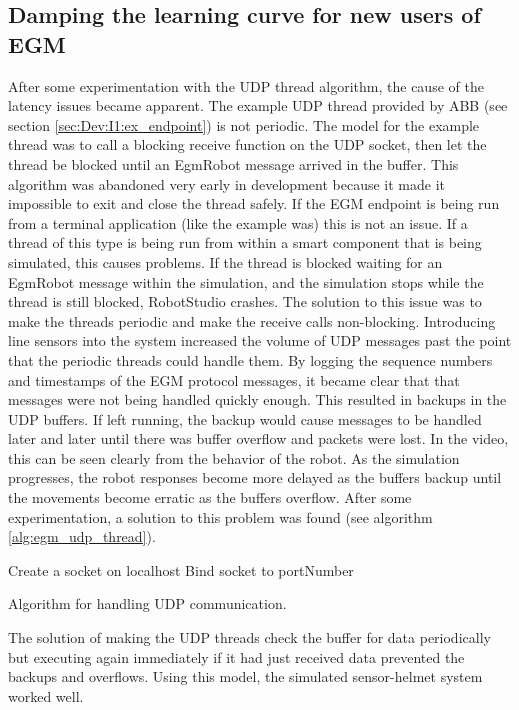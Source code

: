 \documentclass{cslthse-msc}
\begin{document}
\subsection{Damping the learning curve for new users of EGM}
\label{sec:Dev:I2:fixing_udp_thread}
After some experimentation with the UDP thread algorithm, the cause of the latency issues became apparent. The example UDP thread provided by ABB (see section \ref{sec:Dev:I1:ex_endpoint}) is not periodic. The model for the example thread was to call a blocking receive function on the UDP socket, then let the thread be blocked until an EgmRobot message arrived in the buffer. This algorithm was abandoned very early in development because it made it impossible to exit and close the thread safely. If the EGM endpoint is being run from a terminal application (like the example was) this is not an issue. If a thread of this type is being run from within a smart component that is being simulated, this causes problems. If the thread is blocked waiting for an EgmRobot message within the simulation, and the simulation stops while the thread is still blocked, RobotStudio crashes. The solution to this issue was to make the threads periodic and make the receive calls non-blocking. Introducing line sensors into the system increased the volume of UDP messages past the point that the periodic threads could handle them. By logging the sequence numbers and timestamps of the EGM protocol messages, it became clear that that messages were not being handled quickly enough. This resulted in backups in the UDP buffers. If left running, the backup would cause messages to be handled later and later until there was buffer overflow and packets were lost. In the video, this can be seen clearly from the behavior of the robot. As the simulation progresses, the robot responses become more delayed as the buffers backup until the movements become erratic as the buffers overflow. After some experimentation, a solution to this problem was found (see algorithm \ref{alg:egm_udp_thread}). 
\begin{algorithm}[H]
\label{alg:egm_udp_thread}
 Create a socket on localhost\;
 Bind socket to portNumber\;
 \caption{Algorithm for handling UDP communication.}
\end{algorithm}
$$ $$
The solution of making the UDP threads check the buffer for data periodically but executing again immediately if it had just received data prevented the backups and overflows. Using this model, the simulated sensor-helmet system worked well. 
\end{document}
